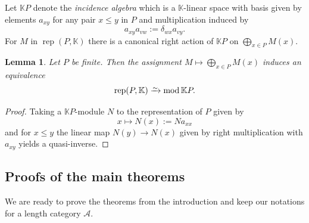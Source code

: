 \documentclass[a4paper]{amsart}
\theoremstyle{plain}
\newtheorem{lem}[thm]{Lemma}
\theoremstyle{definition}
\theoremstyle{remark}
\numberwithin{equation}{section}
\renewcommand{\mod}{\operatorname{mod}}
\newcommand{\rep}{\operatorname{rep}}
\newcommand{\iso}{\xrightarrow{\raisebox{-.4ex}[0ex][0ex]{$\scriptstyle{\sim}$}}}
\def\A{\mathcal A}
\def\bbK{\mathbb K}
\begin{document}
Let $\bbK P$ denote the \emph{incidence algebra} which is a
$\bbK$-linear space with basis given by elements $a_{xy}$ for any pair
$x\le y$ in $P$ and multiplication induced by
\begin{equation*}\label{eq:mult-a}
  a_{xy}a_{vw}:=\delta_{wx} a_{vy}. 
\end{equation*}
For $M$ in $\rep(P,\bbK)$ there is a canonical right
action of $\bbK P$ on $\bigoplus_{x\in P} M(x)$.

\begin{lem}\label{le:rep}
  Let $P$ be finite. Then the assignment
  $M\mapsto \bigoplus_{x\in P} M(x)$ induces an equivalence
  \[\rep(P,\bbK)\iso\mod \bbK P.\]
\end{lem}
\begin{proof}
Taking a $\bbK P$-module $N$ to the representation of $P$ given by \[x\mapsto
N(x):=Na_{xx}\] and for $x\le y$ the linear map $N(y)\to N(x)$ given by
right multiplication with $a_{xy}$ yields a quasi-inverse.
\end{proof}

\subsection*{Proofs of the main theorems}

We are ready to prove the theorems from the introduction and keep our
notations for a length category $\A$.
\end{document}
